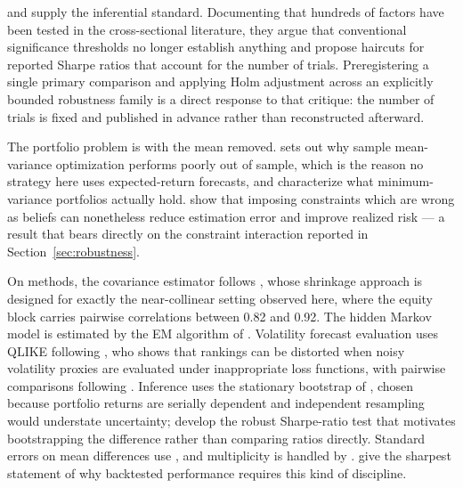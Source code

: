 \citet{harvey2015} and \citet{harvey2016} supply the inferential
standard. Documenting that hundreds of factors have been tested in the
cross-sectional literature, they argue that conventional significance
thresholds no longer establish anything and propose haircuts for
reported Sharpe ratios that account for the number of trials.
Preregistering a single primary comparison and applying Holm adjustment
across an explicitly bounded robustness family is a direct response to
that critique: the number of trials is fixed and published in advance
rather than reconstructed afterward.

The portfolio problem is \citet{markowitz1952} with the mean removed.
\citet{michaud1989} sets out why sample mean-variance optimization
performs poorly out of sample, which is the reason no strategy here uses
expected-return forecasts, and \citet{clarke2011} characterize what
minimum-variance portfolios actually hold. \citet{jagannathan2003} show
that imposing constraints which are wrong as beliefs can nonetheless
reduce estimation error and improve realized risk --- a result that
bears directly on the constraint interaction reported in
Section~\ref{sec:robustness}.

On methods, the covariance estimator follows \citet{ledoit2004}, whose
shrinkage approach is designed for exactly the near-collinear setting
observed here, where the equity block carries pairwise correlations
between 0.82 and 0.92. The hidden Markov model is estimated by the EM
algorithm of \citet{dempster1977}. Volatility forecast evaluation uses
QLIKE following \citet{patton2011}, who shows that rankings can be
distorted when noisy volatility proxies are evaluated under
inappropriate loss functions, with pairwise comparisons following
\citet{diebold1995}. Inference uses the stationary bootstrap of
\citet{politis1994}, chosen because portfolio returns are serially
dependent and independent resampling would understate uncertainty;
\citet{ledoit2008} develop the robust Sharpe-ratio test that motivates
bootstrapping the difference rather than comparing ratios directly.
Standard errors on mean differences use \citet{newey1987}, and
multiplicity is handled by \citet{holm1979}. \citet{bailey2014} give
the sharpest statement of why backtested performance requires this kind
of discipline.
